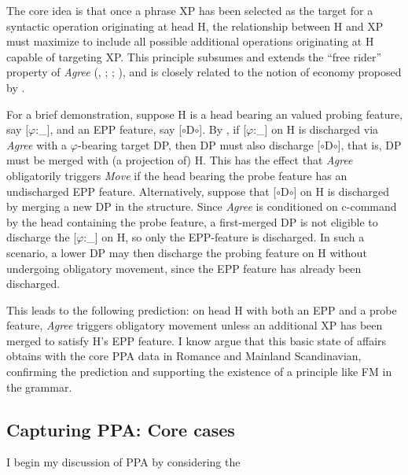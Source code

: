 \documentclass[11pt, letterpaper]{paper_nick}
\newcommand{\fm}[1]{[$\circ$#1$\circ$]}
\begin{document}
The core idea is that once a phrase XP has been selected as the target for a syntactic operation originating at head H, the relationship between H and XP must maximize to include all possible additional operations originating at H capable of targeting XP. This principle subsumes and extends the ``free rider'' property of \emph{Agree} (\citealt{chomsky95}, \citeyear{chomsky01}; \citealt{bruening01}; \citealt{rezac13}), and is closely related to the notion of economy proposed by \citet{pesetsky01}. 

For a brief demonstration, suppose H is a head bearing an valued probing feature, say [$\varphi$:\_], and an EPP feature, say \fm{D}. By \Last, if [$\varphi$:\_] on H is discharged via \emph{Agree} with a $\varphi$-bearing target DP, then DP must also discharge \fm{D}, that is, DP must be merged with (a projection of) H. This has the effect that \emph{Agree} obligatorily triggers \emph{Move} if the head bearing the probe feature has an undischarged EPP feature. 
Alternatively, suppose that \fm{D} on H is discharged by merging a new DP in the structure. Since \emph{Agree} is conditioned on c-command by the head containing the probe feature, a first-merged DP is not eligible to discharge the [$\varphi$:\_] on H, so only the EPP-feature is discharged. In such a scenario, a lower DP may then discharge the probing feature on H without undergoing obligatory movement, since the EPP feature has already been discharged. 

This leads to the following prediction: on head H with both an EPP and a probe feature, \emph{Agree} triggers obligatory movement unless an additional XP has been merged to satisfy H's EPP feature. I know argue that this basic state of affairs obtains with the core PPA data in Romance and Mainland Scandinavian, confirming the prediction and supporting the existence of a principle like FM in the grammar. 

\subsection{Capturing PPA: Core cases}
I begin my discussion of PPA by considering the 
\end{document}

